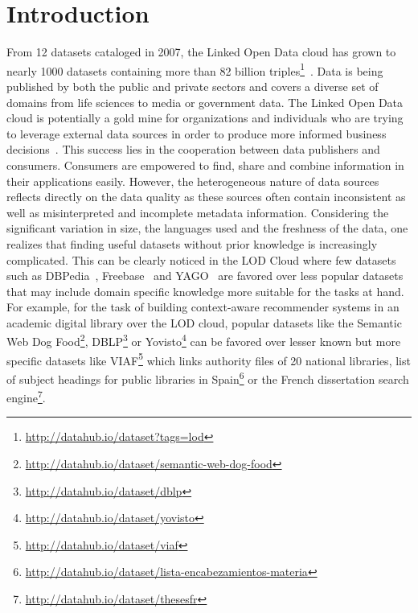 \documentclass[runningheads,a4paper]{llncs}
\begin{document}
\section{Introduction}
\label{sec:introduction}
From 12 datasets cataloged in 2007, the Linked Open Data cloud has grown to nearly 1000 datasets containing more than 82 billion triples\footnote{\url{http://datahub.io/dataset?tags=lod}}~\cite{BizerHeath2009}. Data is being published by both the public and private sectors and covers a diverse set of domains from life sciences to media or government data. The Linked Open Data cloud is potentially a gold mine for organizations and individuals who are trying to leverage external data sources in order to produce more informed business decisions~\cite{Boyd2011}. This success lies in the cooperation between data publishers and consumers. Consumers are empowered to find, share and combine information in their applications easily. However, the heterogeneous nature of data sources reflects directly on the data quality as these sources often contain inconsistent as well as misinterpreted and incomplete metadata information. Considering the significant variation in size, the languages used and the freshness of the data, one realizes that finding useful datasets without prior knowledge is increasingly complicated. This can be clearly noticed in the LOD Cloud where few datasets such as DBPedia~\cite{Bizer:2009:DCP:1640541.1640848}, Freebase~\cite{Bollacker:2008:FCC:1376616.1376746} and YAGO~\cite{Suchanek:2007:YCS:1242572.1242667} are favored over less popular datasets that may include domain specific knowledge more suitable for the tasks at hand. For example, for the task of building context-aware recommender systems in an academic digital library over the LOD cloud, popular datasets like the Semantic Web Dog Food\footnote{\url{http://datahub.io/dataset/semantic-web-dog-food}}, DBLP\footnote{\url{http://datahub.io/dataset/dblp}} or Yovisto\footnote{\url{http://datahub.io/dataset/yovisto}} can be favored over lesser known but more specific datasets like VIAF\footnote{\url{http://datahub.io/dataset/viaf}} which links authority files of 20 national libraries, list of subject headings for public libraries in Spain\footnote{\url{http://datahub.io/dataset/lista-encabezamientos-materia}} or the French dissertation search engine\footnote{\url{http://datahub.io/dataset/thesesfr}}.
\end{document}
